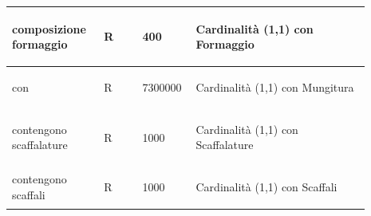 \documentclass[12pt,a4paper]{article}
\begin{document}
\begin{center}
\begin{longtable}{|p{0.23\linewidth}|p{0.1\linewidth}|p{0.11\linewidth}|p{0.45\linewidth}|}
\hline
composizione formaggio 				& \begin{center}
\vspace{-25pt}R
\end{center}
					& \begin{center}
					\vspace{-25pt}400\end{center}
					& \begin{flushleft}\vspace{-25pt} Cardinalità (1,1) con Formaggio \end{flushleft}\\ 

\hline
con 				& \begin{center}
\vspace{-25pt}R
\end{center}
					& \begin{center}
					\vspace{-25pt}7300000\end{center}
					& \begin{flushleft}\vspace{-25pt} Cardinalità (1,1) con Mungitura \end{flushleft}\\ 

\hline
contengono scaffalature 				& \begin{center}
\vspace{-25pt}R
\end{center}
					& \begin{center}
					\vspace{-25pt}1000\end{center}
					& \begin{flushleft}\vspace{-25pt} Cardinalità (1,1) con Scaffalature \end{flushleft}\\ 

\hline
contengono scaffali 				& \begin{center}
\vspace{-25pt}R
\end{center}
					& \begin{center}
					\vspace{-25pt}1000\end{center}
					& \begin{flushleft}\vspace{-25pt} Cardinalità (1,1) con Scaffali \end{flushleft}\\ 


\end{longtable}
\end{center}
\end{document}
